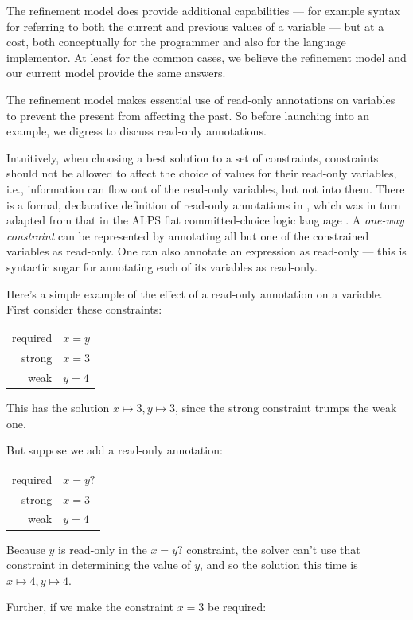 \documentclass{article}
\begin{document}
The refinement model does provide additional capabilities --- for
example syntax for referring to both the current and previous values
of a variable --- but at a cost, both conceptually for the programmer
and also for the language implementor.  At least for the common cases,
we believe the refinement model and our current model provide the same
answers.  

The refinement model makes essential use of read-only annotations on
variables to prevent the present from affecting the past.  So before
launching into an example, we digress to discuss read-only
annotations.

Intuitively, when choosing a best solution to a set of constraints,
constraints should not be allowed to affect the choice of values for
their read-only variables, i.e., information can flow out of the
read-only variables, but not into them.  There is a formal,
declarative definition of read-only annotations in
\cite{borning-lisp-symbolic-computation-1992}, which was in turn
adapted from that in the ALPS flat committed-choice logic language
\cite{maher-iclp-1987}.  A \emph{one-way constraint} can be
represented by annotating all but one of the constrained variables as
read-only.  One can also annotate an expression as read-only --- this
is syntactic sugar for annotating each of its variables as read-only.

Here's a simple example of the effect of a read-only annotation on a
variable.  First consider these constraints:

\begin{tabular}{rl}
required & $x=y$ \\
strong   & $x=3$ \\
weak     & $y=4$
\end{tabular}

This has the solution $x \mapsto 3, y \mapsto 3$, since the strong
constraint trumps the weak one.  

But suppose we add a read-only annotation:

\begin{tabular}{rl}
required & $x=y?$ \\
strong   & $x=3$ \\
weak     & $y=4$
\end{tabular}

Because $y$ is read-only in the $x=y?$ constraint, the solver can't
use that constraint in determining the value of $y$, and so the
solution this time is $x \mapsto 4, y \mapsto 4$.

Further, if we make the constraint $x=3$ be required:
\end{document}
